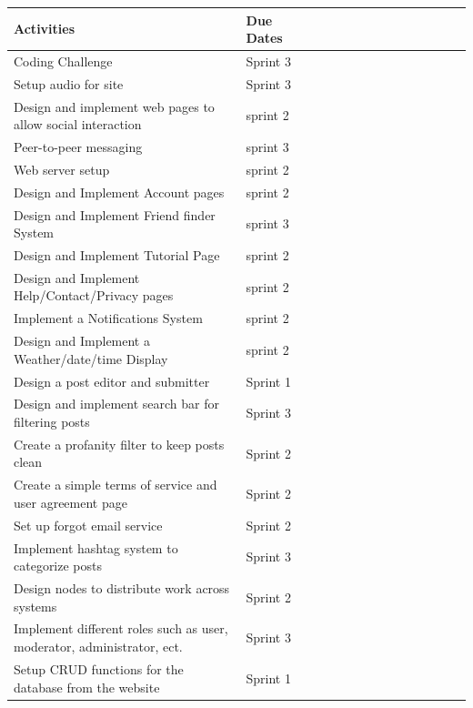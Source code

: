 \documentclass[10pt,titlepage]{article}
\begin{document}
	\begin{table}[!ht]
		\centering
		\begin{tabular}{|l|l|l|l|l|l|l|l|l|l|l|l|l|l|l|}
			\hline
			\textbf{Activities} & \textbf{Due Dates} \\ \hline
			Coding Challenge  & Sprint 3  \\ \hline
			Setup audio for site  & Sprint 3  \\ \hline
			Design and implement web pages to allow social interaction  & sprint 2  \\ \hline
			Peer-to-peer messaging & sprint 3 \\ \hline
			Web server setup & sprint 2  \\ \hline
			Design and Implement Account pages & sprint 2 \\ \hline
			Design and Implement Friend finder System & sprint 3 \\ \hline
			Design and Implement Tutorial Page & sprint 2 \\ \hline
			Design and Implement Help/Contact/Privacy pages & sprint 2 \\ \hline
			Implement a Notifications System & sprint 2 \\ \hline
			Design and Implement a Weather/date/time Display & sprint 2 \\ \hline
		  	Design a post editor and submitter & Sprint 1 \\ \hline
			Design and implement search bar for filtering posts & Sprint 3 \\ \hline
			Create a profanity filter to keep posts clean & Sprint 2 \\ \hline
			Create a simple terms of service and user agreement page & Sprint 2 \\ \hline
            Set up forgot email service & Sprint 2 \\ \hline
            Implement hashtag system to categorize posts & Sprint 3 \\ \hline
            Design nodes to distribute work across systems & Sprint 2 \\ \hline
            Implement different roles such as user, moderator, administrator, ect. & Sprint 3 \\ \hline
            Setup CRUD functions for the database from the website & Sprint 1 \\ \hline
		\end{tabular}
	\end{table}
	
\end{document}
